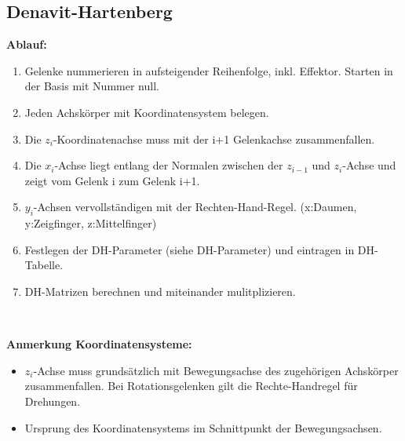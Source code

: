 \clearpage
\subsection{Denavit-Hartenberg}
\begin{minipage}{19cm}
    \textbf{Ablauf:}
    \begin{enumerate}{\setlength{\itemsep}{0cm}\setlength{\parsep}{0cm} \setlength{\topsep}{0cm}}
        \item Gelenke nummerieren in aufsteigender Reihenfolge, inkl. Effektor. Starten in der Basis mit Nummer null.
        \item Jeden Achskörper mit Koordinatensystem belegen.
        \item Die $z_i$-Koordinatenachse muss mit der i+1 Gelenkachse zusammenfallen.
        \item Die $x_i$-Achse liegt entlang der Normalen zwischen der $z_{i-1}$ und $z_i$-Achse und zeigt vom Gelenk i zum Gelenk i+1.
        \item $y_i$-Achsen vervollständigen mit der Rechten-Hand-Regel. (x:Daumen, y:Zeigfinger, z:Mittelfinger)
        \item Festlegen der DH-Parameter (siehe DH-Parameter) und eintragen in DH-Tabelle.
        \item DH-Matrizen berechnen und miteinander mulitplizieren.
    \end{enumerate}
    \vspace{0.2cm}
\end{minipage}\\

\begin{minipage}{19cm}
    \textbf{Anmerkung Koordinatensysteme:}
    \begin{itemize}\itemsep0pt
        \item $z_i$-Achse muss grundsätzlich mit Bewegungsachse des zugehörigen Achskörper zusammenfallen.
        Bei Rotationsgelenken gilt die Rechte-Handregel für Drehungen. 
        \item Ursprung des Koordinatensystems im Schnittpunkt der Bewegungsachsen.
    \end{itemize}
    \vspace{0.2cm}
\end{minipage}\\


